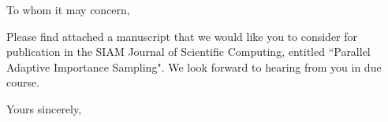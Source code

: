 \documentclass{letter}
\begin{document}
\date{}
\begin{letter}{ }

\opening{To whom it may concern,}

Please find attached a manuscript that we would like you to consider for publication in the SIAM Journal of  Scientific Computing, entitled ``Parallel Adaptive Importance Sampling". We look forward to hearing from you in due course.

\closing{Yours sincerely,}
\end{letter}
\end{document}
